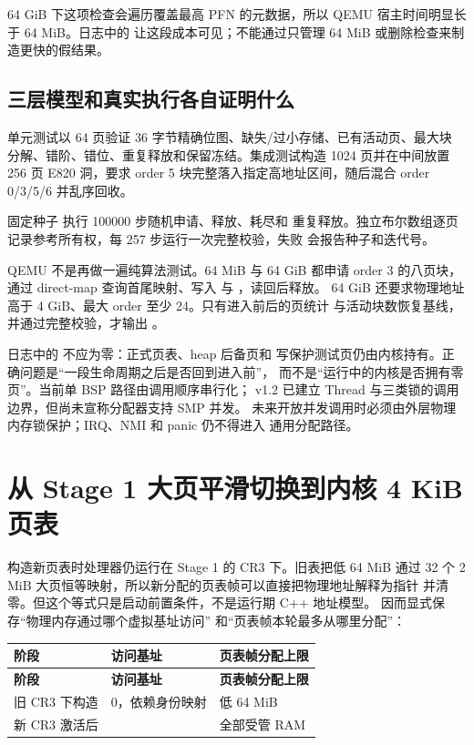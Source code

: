 64 GiB 下这项检查会遍历覆盖最高 PFN 的元数据，所以 QEMU 宿主时间明显长于
64 MiB。日志中的 \code{[QEMU][T+......ms]} 让这段成本可见；不能通过只管理
64 MiB 或删除检查来制造更快的假结果。

\subsection{三层模型和真实执行各自证明什么}

单元测试以 64 页验证 36 字节精确位图、缺失/过小存储、已有活动页、最大块
分解、错阶、错位、重复释放和保留冻结。集成测试构造 1024 页并在中间放置
256 页 E820 洞，要求 order 5 块完整落入指定高地址区间，随后混合 order
0/3/5/6 并乱序回收。

固定种子  执行 100000 步随机申请、释放、耗尽和
重复释放。独立布尔数组逐页记录参考所有权，每 257 步运行一次完整校验，失败
会报告种子和迭代号。

QEMU 不是再做一遍纯算法测试。64 MiB 与 64 GiB 都申请 order 3 的八页块，
通过 direct-map 查询首尾映射、写入
 与 ，读回后释放。
64 GiB 还要求物理地址高于 4 GiB、最大 order 至少 24。只有进入前后的页统计
与活动块数恢复基线，并通过完整校验，才输出
。

日志中的  不应为零：正式页表、heap 后备页和
写保护测试页仍由内核持有。正确问题是“一段生命周期之后是否回到进入前”，
而不是“运行中的内核是否拥有零页”。当前单 BSP 路径由调用顺序串行化；
v1.2 已建立 Thread 与三类锁的调用边界，但尚未宣称分配器支持 SMP 并发。
未来开放并发调用时必须由外层物理内存锁保护；IRQ、NMI 和 panic 仍不得进入
通用分配路径。

\section{从 Stage 1 大页平滑切换到内核 4 KiB 页表}

构造新页表时处理器仍运行在 Stage 1 的 CR3 下。旧表把低 64 MiB 通过
32 个 2 MiB 大页恒等映射，所以新分配的页表帧可以直接把物理地址解释为指针
并清零。但这个等式只是启动前置条件，不是运行期 C++ 地址模型。
 因而显式保存“物理内存通过哪个虚拟基址访问”
和“页表帧本轮最多从哪里分配”：

\begin{longtable}{L{0.28\textwidth}L{0.25\textwidth}L{0.35\textwidth}}
\toprule
\textbf{阶段} & \textbf{访问基址} & \textbf{页表帧分配上限}\\
\midrule
\endfirsthead
\toprule
\textbf{阶段} & \textbf{访问基址} & \textbf{页表帧分配上限}\\
\midrule
\endhead
旧 CR3 下构造 & 0，依赖身份映射 & 低 64 MiB\\
新 CR3 激活后 &  & 全部受管 RAM\\
\bottomrule
\end{longtable}


